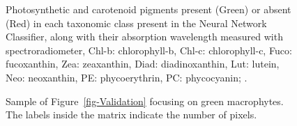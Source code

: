 \documentclass[
  number]{elsarticle}
\begin{document}
\label{cell-fig-Pigm}
\begin{figure}[H]


\caption{\label{fig-Pigm}Photosynthetic and carotenoid pigments present
(Green) or absent (Red) in each taxonomic class present in the Neural
Network Classifier, along with their absorption wavelength measured with
spectroradiometer, Chl-b: chlorophyll-b, Chl-c: chlorophyll-c, Fuco:
fucoxanthin, Zea: zeaxanthin, Diad: diadinoxanthin, Lut: lutein, Neo:
neoxanthin, PE: phycoerythrin, PC: phycocyanin;
\citetext{\citealp{ralph2002}; \citealp[
\citep{christensen1977seaweeds}]{Douay2022}; \citealp{cartaxana2016regulation}; \citealp{meleder2013vivo}}.}

\end{figure}%

\label{cell-fig-ValidationGreen}
\begin{figure}[H]


\caption{\label{fig-ValidationGreen}Sample of
Figure~\ref{fig-Validation} focusing on green macrophytes. The labels
inside the matrix indicate the number of pixels.}

\end{figure}%
\end{document}

